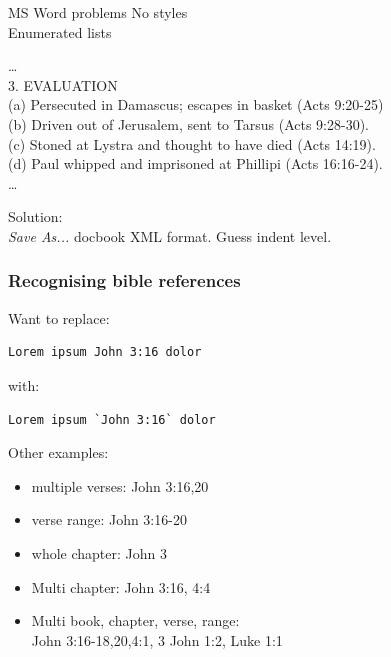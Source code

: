 \documentclass{beamer}
\begin{document}
    \begin{frame}{MS Word problems}
    No styles\\
        Enumerated lists
        \begin{framed} %
            \ldots\\
3. EVALUATION\\
\quad (a) Persecuted in Damascus; escapes in basket (Acts 9:20-25)\\
\quad (b) Driven out of Jerusalem, sent to Tarsus (Acts 9:28-30).\\
\quad (c) Stoned at Lystra and thought to have died (Acts 14:19).\\
        \quad (d) Paul whipped and imprisoned at Phillipi (Acts 16:16-24).\\
        \ldots
    \end{framed}
    Solution:\\
    \emph{Save As...} docbook XML format. Guess indent level.  
    \end{frame}
    
    \begin{frame}[fragile]
        \frametitle{Recognising bible references}
         Want to replace:\\
         \begin{verbatim}Lorem ipsum John 3:16 dolor
\end{verbatim}
         with:\\
         \begin{verbatim}Lorem ipsum `John 3:16` dolor
\end{verbatim}
Other examples:
\begin{itemize}
\item multiple verses: John 3:16,20
\item verse range: John 3:16-20
\item whole chapter: John 3
\item Multi chapter: John 3:16, 4:4
\item Multi book, chapter, verse, range:\\
    John 3:16-18,20,4:1, 3 John 1:2, Luke 1:1
\end{itemize}
\end{frame}
\end{document}
